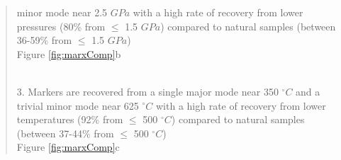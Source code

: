 \begin{quote}
\hspace*{0.333em}\hspace*{0.333em}\hspace*{0.333em}\hspace*{0.333em}minor mode near 2.5 \(GPa\) with a high rate of recovery from lower\\
\hspace*{0.333em}\hspace*{0.333em}\hspace*{0.333em}\hspace*{0.333em}pressures (80\% from \(\leq\) 1.5 \(GPa\)) compared to natural samples (between\\
\hspace*{0.333em}\hspace*{0.333em}\hspace*{0.333em}\hspace*{0.333em}36-59\% from \(\leq\) 1.5 \(GPa\))\\
\hspace*{0.333em}\hspace*{0.333em}\hspace*{0.333em}\hspace*{0.333em}Figure \ref{fig:marxComp}b\\
\strut \\
\hspace*{0.333em}3. Markers are recovered from a single major mode near 350 \(^\circ C\) and a\\
\hspace*{0.333em}\hspace*{0.333em}\hspace*{0.333em}\hspace*{0.333em}trivial minor mode near 625 \(^\circ C\) with a high rate of recovery from lower\\
\hspace*{0.333em}\hspace*{0.333em}\hspace*{0.333em}\hspace*{0.333em}temperatures (92\% from \(\leq\) 500 \(^\circ C\)) compared to natural samples\\
\hspace*{0.333em}\hspace*{0.333em}\hspace*{0.333em}\hspace*{0.333em}(between 37-44\% from \(\leq\) 500 \(^\circ C\))\\
\hspace*{0.333em}\hspace*{0.333em}\hspace*{0.333em}\hspace*{0.333em}Figure \ref{fig:marxComp}c\\

\end{quote}
